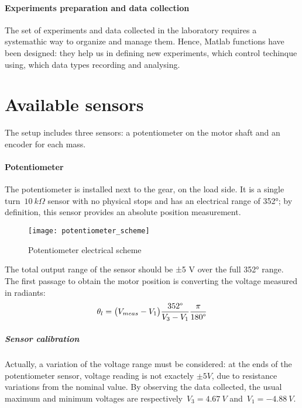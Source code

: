 
\paragraph{Experiments preparation and data collection}

The set of experiments and data collected in the laboratory requires a systemathic way to organize and manage them. Hence, Matlab functions have been designed: they help us in defining new experiments, which control techinque using, which data types recording and analysing.

\section{Available sensors}

The setup includes three sensors: a potentiometer on the motor shaft and an encoder for each mass.

\paragraph{Potentiometer}

The potentiometer is installed next to the gear, on the load side. It is a single turn~$10 \ k\Omega$ sensor with no physical stops and has an electrical range of 352°; by definition, this sensor provides an absolute position measurement. \\
\begin{figure*}[h]
	\centering
	\texttt{[image: potentiometer\_scheme]}
	\caption{Potentiometer electrical scheme}
\end{figure*}

The total output range of the sensor should be ±5 V over the full 352° range.
The first passage to obtain the motor position is converting the voltage measured in radiants:
\[
	\theta_l = \bigl{(} V_{meas} - V_1 \bigr{)} \frac{352 \degree }{V_3 - V_1} \frac{\pi}{180 \degree }
\]

\subparagraph{Sensor calibration}
Actually, a variation of the voltage range must be considered: at the ends of the potentiometer sensor, voltage reading is not exactely $\pm 5V$, due to resistance variations from the nominal value. By observing the data collected, the usual maximum and minimum voltages are respectively~$V_3=4.67 \ V$ and~$V_1=-4.88 \ V$.

